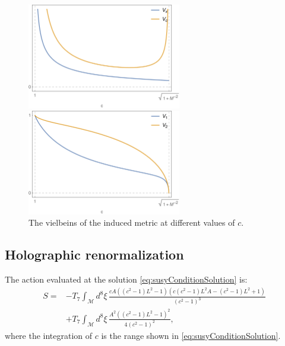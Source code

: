 \begin{figure}[t!]
\begin{center}
\includegraphics[width=0.6\textwidth]{pictures/vxvc.png}
\end{center}
\vspace{0.05mm}
\begin{center}
\includegraphics[width=0.6\textwidth]{pictures/v1v2.png}
\end{center}
\caption{\label{fig:vielbeins} The vielbeins of the induced metric at different values of $c$.}
\end{figure}



\subsection{Holographic renormalization}

The action evaluated at the solution \eqref{eq:susyConditionSolution} is:
\begin{align}\label{eq:ActionAtSolution}
 S = & -T_7 \int_\mathcal{M} d^8\xi \, 
 \frac{c A \left(\left(c^2-1\right) L^2-1\right) \left(c \left(c^2-1\right) L^2 A-\left(c^2-1\right) L^2+1\right)}{\left(c^2-1\right)^3}
 \nonumber \\
     & +T_7\int _\mathcal{M} d^8\xi \, 
 \frac{A^2 \left(\left(c^2-1\right) L^2-1\right)^2}{4 \left(c^2-1\right)^2},
\end{align}
where the integration of $c$ is the range shown in \eqref{eq:susyConditionSolution}.

